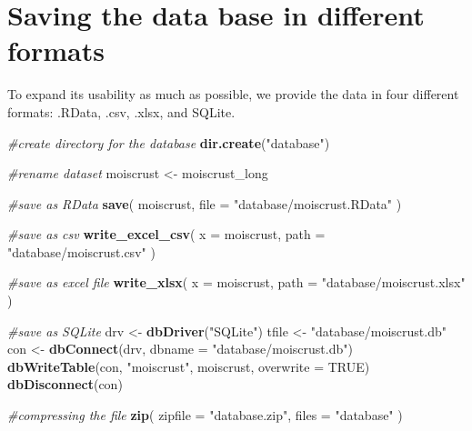\documentclass[]{article}
\newenvironment{Shaded}{\begin{snugshade}}{\end{snugshade}}
\newcommand{\CommentTok}[1]{\textcolor[rgb]{0.56,0.35,0.01}{\textit{#1}}}
\newcommand{\DataTypeTok}[1]{\textcolor[rgb]{0.13,0.29,0.53}{#1}}
\newcommand{\KeywordTok}[1]{\textcolor[rgb]{0.13,0.29,0.53}{\textbf{#1}}}
\newcommand{\NormalTok}[1]{#1}
\newcommand{\OtherTok}[1]{\textcolor[rgb]{0.56,0.35,0.01}{#1}}
\newcommand{\StringTok}[1]{\textcolor[rgb]{0.31,0.60,0.02}{#1}}
\begin{document}
\hypertarget{saving-the-data-base-in-different-formats}{%
\section{Saving the data base in different
formats}\label{saving-the-data-base-in-different-formats}}

To expand its usability as much as possible, we provide the data in four
different formats: .RData, .csv, .xlsx, and SQLite.

\begin{Shaded}
\begin{Highlighting}[]
\CommentTok{#create directory for the database}
\KeywordTok{dir.create}\NormalTok{(}\StringTok{"database"}\NormalTok{)}

\CommentTok{#rename dataset}
\NormalTok{moiscrust <-}\StringTok{ }\NormalTok{moiscrust_long}

\CommentTok{#save as RData}
\KeywordTok{save}\NormalTok{(}
\NormalTok{  moiscrust, }
  \DataTypeTok{file =} \StringTok{"database/moiscrust.RData"}
\NormalTok{  )}

\CommentTok{#save as csv}
\KeywordTok{write_excel_csv}\NormalTok{(}
  \DataTypeTok{x =}\NormalTok{ moiscrust,}
  \DataTypeTok{path =} \StringTok{"database/moiscrust.csv"}
\NormalTok{)}

\CommentTok{#save as excel file}
\KeywordTok{write_xlsx}\NormalTok{(}
  \DataTypeTok{x =}\NormalTok{ moiscrust,}
  \DataTypeTok{path =} \StringTok{"database/moiscrust.xlsx"}
\NormalTok{)}

\CommentTok{#save as SQLite}
\NormalTok{drv <-}\StringTok{ }\KeywordTok{dbDriver}\NormalTok{(}\StringTok{"SQLite"}\NormalTok{)}
\NormalTok{tfile <-}\StringTok{ "database/moiscrust.db"}
\NormalTok{con <-}\StringTok{ }\KeywordTok{dbConnect}\NormalTok{(drv, }\DataTypeTok{dbname =} \StringTok{"database/moiscrust.db"}\NormalTok{)}
\KeywordTok{dbWriteTable}\NormalTok{(con, }\StringTok{"moiscrust"}\NormalTok{, moiscrust, }\DataTypeTok{overwrite =} \OtherTok{TRUE}\NormalTok{)}
\KeywordTok{dbDisconnect}\NormalTok{(con)}

\CommentTok{#compressing the file}
\KeywordTok{zip}\NormalTok{(}
  \DataTypeTok{zipfile =} \StringTok{"database.zip"}\NormalTok{,}
  \DataTypeTok{files =} \StringTok{"database"}
\NormalTok{  )}
\end{Highlighting}
\end{Shaded}
\end{document}
